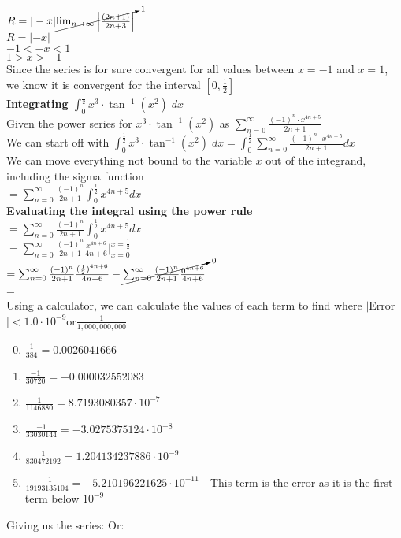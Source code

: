 \documentclass{article}
\begin{document}
\\[0.05in]$R=|-x| \cancelto{1}{\lim_{n\to\infty} \left|\frac{(2n+1)}{2n+3}\right|}$
\\$R=|-x|$
\\$-1<-x<1$
\\$1>x>-1$ 
\\Since the series is for sure convergent for all values between $x=-1$ and $x=1$, we know it is convergent for the interval $[0,\frac{1}{2}]$
\\[1in]
\textbf{Integrating $\int_{0}^{\frac{1}{2}}x^3\cdot \tan^{-1}(x^2)\;dx$}
\\Given the power series for $x^3\cdot \tan^{-1}(x^2)$ as $\sum_{n=0}^{\infty}\frac{(-1)^n\cdot x^{4n+5}}{2n+1}$
\\[0.1in]We can start off with $\int_{0}^{\frac{1}{2}}x^3\cdot \tan^{-1}(x^2)\;dx = \int_{0}^{\frac{1}{2}}\sum_{n=0}^{\infty}\frac{(-1)^n\cdot {x^{4n+5}}}{2n+1}dx$
\\[0.1in]We can move everything not bound to the variable $x$ out of the integrand, including the sigma function
\\[0.1in]$= \sum_{n=0}^{\infty}\frac{(-1)^n}{2n+1}\int_{0}^{\frac{1}{2}} x^{4n+5}dx$
\\[0.1in]\textbf{Evaluating the integral using the power rule}
\\[0.05in]$= \sum_{n=0}^{\infty}\frac{(-1)^n}{2n+1}\int_{0}^{\frac{1}{2}} x^{4n+5}dx$
\\[0.05in]$=\sum_{n=0}^{\infty}\frac{(-1)^n}{2n+1}\frac{x^{4n+6}}{4n+6} \bigg|_{x=0}^{x=\frac{1}{2}}$
\\[0.05in]$=\sum_{n=0}^{\infty}\frac{(-1)^n}{2n+1}\frac{(\frac{1}{2})^{4n+6}}{4n+6} -\cancelto{0}{\sum_{n=0}^{\infty}\frac{(-1)^n}{2n+1}\frac{0^{4n+6}}{4n+6}} $
\\[0.05in]=
\\[0.1in]Using a calculator, we can calculate the values of each term to find where $|$Error$| < 1.0\cdot 10^{-9} $or$ \frac{1}{1,000,000,000}$
\begin{enumerate}
    \setcounter{enumi}{-1}
    \item $\frac{1}{384} = 0.0026041666$
    \item $\frac{-1}{30720}=-0.000032552083$
    \item $\frac{1}{1146880}=8.7193080357\cdot 10^{-7}$
    \item $\frac{-1}{33030144} =-3.0275375124\cdot 10^{-8}$
    \item $\frac{1}{830472192} = 1.204134237886 \cdot 10^{-9}$
    \item $\frac{-1}{19193135104} = -5.210196221625\cdot 10^{-11}$ - This term is the error as it is the first term below $10^{-9}$
\end{enumerate}
Giving us the series: 
Or: 
\vfill\null\pagebreak
\end{document}
